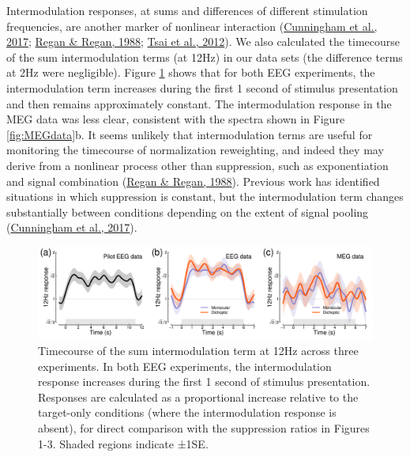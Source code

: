 \documentclass[
]{article}
\begin{document}
Intermodulation responses, at sums and differences of different stimulation frequencies, are another marker of nonlinear interaction (\protect\hyperlink{ref-Cunningham2017}{Cunningham et al., 2017}; \protect\hyperlink{ref-Regan1988}{Regan \& Regan, 1988}; \protect\hyperlink{ref-Tsai2012}{Tsai et al., 2012}). We also calculated the timecourse of the sum intermodulation terms (at 12Hz) in our data sets (the difference terms at 2Hz were negligible). Figure \ref{fig:IMplot} shows that for both EEG experiments, the intermodulation term increases during the first 1 second of stimulus presentation and then remains approximately constant. The intermodulation response in the MEG data was less clear, consistent with the spectra shown in Figure \ref{fig:MEGdata}b. It seems unlikely that intermodulation terms are useful for monitoring the timecourse of normalization reweighting, and indeed they may derive from a nonlinear process other than suppression, such as exponentiation and signal combination (\protect\hyperlink{ref-Regan1988}{Regan \& Regan, 1988}). Previous work has identified situations in which suppression is constant, but the intermodulation term changes substantially between conditions depending on the extent of signal pooling (\protect\hyperlink{ref-Cunningham2017}{Cunningham et al., 2017}).

\begin{figure}

{\centering \includegraphics{Figures/IMfigure} 

}

\caption{Timecourse of the sum intermodulation term at 12Hz across three experiments. In both EEG experiments, the intermodulation response increases during the first 1 second of stimulus presentation. Responses are calculated as a proportional increase relative to the target-only conditions (where the intermodulation response is absent), for direct comparison with the suppression ratios in Figures 1-3. Shaded regions indicate ±1SE.}\label{fig:IMplot}
\end{figure}
\end{document}

